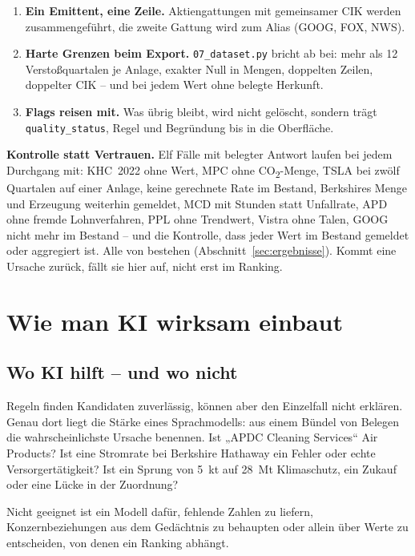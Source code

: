\documentclass[11pt,a4paper]{article}
\newcommand{\befund}[1]{%
  \par\vspace{2pt}\noindent\colorbox{softgrey}{%
  \begin{minipage}{\dimexpr\linewidth-2\fboxsep}\small\vspace{3pt}#1\vspace{3pt}\end{minipage}}\par\vspace{4pt}}
\begin{document}
\begin{enumerate}
\item \textbf{Ein Emittent, eine Zeile.} Aktiengattungen mit gemeinsamer CIK werden zusammengeführt, die zweite Gattung wird zum Alias (GOOG, FOX, NWS).
\item \textbf{Harte Grenzen beim Export.} \texttt{07\_dataset.py} bricht ab bei: mehr als 12 Verstoßquartalen je Anlage, exakter Null in Mengen, doppelten Zeilen, doppelter CIK -- und bei jedem Wert ohne belegte Herkunft.
\item \textbf{Flags reisen mit.} Was übrig bleibt, wird nicht gelöscht, sondern trägt \texttt{quality\_status}, Regel und Begründung bis in die Oberfläche.
\end{enumerate}

\befund{\textbf{Kontrolle statt Vertrauen.} Elf Fälle mit belegter Antwort laufen bei jedem Durchgang mit: KHC~2022 ohne Wert, MPC ohne CO\textsubscript{2}-Menge, TSLA bei zwölf Quartalen auf einer Anlage, keine gerechnete Rate im Bestand, Berkshires Menge und Erzeugung weiterhin gemeldet, MCD mit Stunden statt Unfallrate, APD ohne fremde Lohnverfahren, PPL ohne Trendwert, Vistra ohne Talen, GOOG nicht mehr im Bestand -- und die Kontrolle, dass jeder Wert im Bestand gemeldet oder aggregiert ist. Alle \repBehoben{} von \repGesamt{} bestehen (Abschnitt~\ref{sec:ergebnisse}). Kommt eine Ursache zurück, fällt sie hier auf, nicht erst im Ranking.}

\section{Wie man KI wirksam einbaut}

\subsection{Wo KI hilft -- und wo nicht}

Regeln finden Kandidaten zuverlässig, können aber den Einzelfall nicht erklären. Genau dort liegt die Stärke eines Sprachmodells: aus einem Bündel von Belegen die wahrscheinlichste Ursache benennen. Ist „APDC Cleaning Services“ Air Products? Ist eine Stromrate bei Berkshire Hathaway ein Fehler oder echte Versorgertätigkeit? Ist ein Sprung von 5~kt auf 28~Mt Klimaschutz, ein Zukauf oder eine Lücke in der Zuordnung?

Nicht geeignet ist ein Modell dafür, fehlende Zahlen zu liefern, Konzernbeziehungen aus dem Gedächtnis zu behaupten oder allein über Werte zu entscheiden, von denen ein Ranking abhängt.
\end{document}
